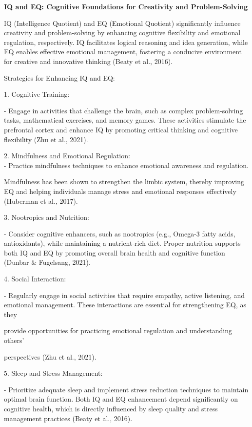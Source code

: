 \documentclass[
]{article}
\begin{document}
\textbf{IQ and EQ: Cognitive Foundations for Creativity and
Problem-Solving}

IQ (Intelligence Quotient) and EQ (Emotional Quotient) significantly
influence creativity and problem-solving by enhancing cognitive
flexibility and emotional regulation, respectively. IQ facilitates
logical reasoning and idea generation, while EQ enables effective
emotional management, fostering a conducive environment for creative and
innovative thinking (Beaty et al., 2016).

Strategies for Enhancing IQ and EQ:

1. Cognitive Training:

- Engage in activities that challenge the brain, such as complex
problem-solving tasks, mathematical exercises, and memory games. These
activities stimulate the prefrontal cortex and enhance IQ by promoting
critical thinking and cognitive flexibility (Zhu et al., 2021).

2. Mindfulness and Emotional Regulation:\\
- Practice mindfulness techniques to enhance emotional awareness and
regulation.

Mindfulness has been shown to strengthen the limbic system, thereby
improving EQ and helping individuals manage stress and emotional
responses effectively (Huberman et al., 2017).

3. Nootropics and Nutrition:

- Consider cognitive enhancers, such as nootropics (e.g., Omega-3 fatty
acids, antioxidants), while maintaining a nutrient-rich diet. Proper
nutrition supports both IQ and EQ by promoting overall brain health and
cognitive function (Dunbar \& Fugelsang, 2021).

4. Social Interaction:

- Regularly engage in social activities that require empathy, active
listening, and emotional management. These interactions are essential
for strengthening EQ, as they

provide opportunities for practicing emotional regulation and
understanding others'

perspectives (Zhu et al., 2021).

5. Sleep and Stress Management:

- Prioritize adequate sleep and implement stress reduction techniques to
maintain optimal brain function. Both IQ and EQ enhancement depend
significantly on cognitive health, which is directly influenced by sleep
quality and stress management practices (Beaty et al., 2016).
\end{document}
